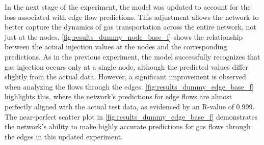 %
%

\begin{figure}
    \centering
        \setlength{}        
        \setlength{} 
    \caption{}\label{fig:}
\end{figure}


In the next stage of the experiment, the model was updated to account for the loss associated with edge flow predictions. This adjustment allows the network to better capture the dynamics of gas transportation across the entire network, not just at the nodes. \cref{fig:results_dummy_node_base_f} shows the relationship between the actual injection values at the nodes and the corresponding predictions. As in the previous experiment, the model successfully recognizes that gas injection occurs only at a single node, although the predicted values differ slightly from the actual data. However, a significant improvement is observed when analyzing the flows through the edges. \cref{fig:results_dummy_edge_base_f} highlights this, where the network's predictions for edge flows are almost perfectly aligned with the actual test data, as evidenced by an R-value of 0.999. The near-perfect scatter plot in \cref{fig:results_dummy_edge_base_f} demonstrates the network's ability to make highly accurate predictions for gas flows through the edges in this updated experiment.



\begin{figure}
    \centering
        \setlength{}        
        \setlength{} 
    \caption{}\label{fig:}
\end{figure}


